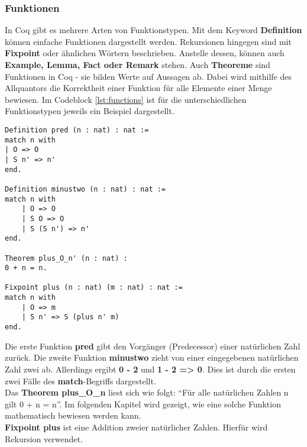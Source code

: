 \subsubsection{Funktionen}
In Coq gibt es mehrere Arten von Funktionstypen. Mit dem Keyword \textbf{Definition} können einfache Funktionen dargestellt werden.
Rekursionen hingegen sind mit \textbf{Fixpoint} oder ähnlichen Wörtern beschrieben. Anstelle dessen, können auch \textbf{Example, Lemma, Fact oder Remark} stehen.
Auch \textbf{Theoreme} sind Funktionen in Coq - sie bilden Werte auf Aussagen ab. Dabei wird mithilfe des Allquantors die Korrektheit einer Funktion für alle Elemente einer Menge bewiesen. 
Im Codeblock \ref{lst:functions} ist für die unterschiedlichen Funktionstypen jeweils ein Beispiel dargestellt.
\begin{lstlisting}[language=coq,firstnumber=1,caption=Coq Funktionen,label=lst:functions]
Definition pred (n : nat) : nat :=
match n with
| O => O
| S n' => n'
end.

Definition minustwo (n : nat) : nat :=
match n with
	| O => O
	| S O => O
	| S (S n') => n'
end.

Theorem plus_O_n' (n : nat) :
0 + n = n.

Fixpoint plus (n : nat) (m : nat) : nat :=
match n with
	| O => m
	| S n' => S (plus n' m)
end.
\end{lstlisting}
Die erste Funktion \textbf{pred} gibt den Vorgänger (Predecessor) einer natürlichen Zahl zurück.
Die zweite Funktion \textbf{minustwo} zieht von einer eingegebenen natürlichen Zahl zwei ab. Allerdings ergibt \textbf{0 - 2} und \textbf{1 - 2 => 0}. Dies ist durch die ersten zwei Fälle des \textbf{match}-Begriffs dargestellt.\\
Das \textbf{Theorem plus\_O\_n} liest sich wie folgt: "`Für alle natürlichen Zahlen n gilt 0 + n = n"'. Im folgenden Kapitel wird gezeigt, wie eine solche Funktion mathematisch bewiesen werden kann.\\
\textbf{Fixpoint plus} ist eine Addition zweier natürlicher Zahlen. Hierfür wird Rekursion verwendet.

